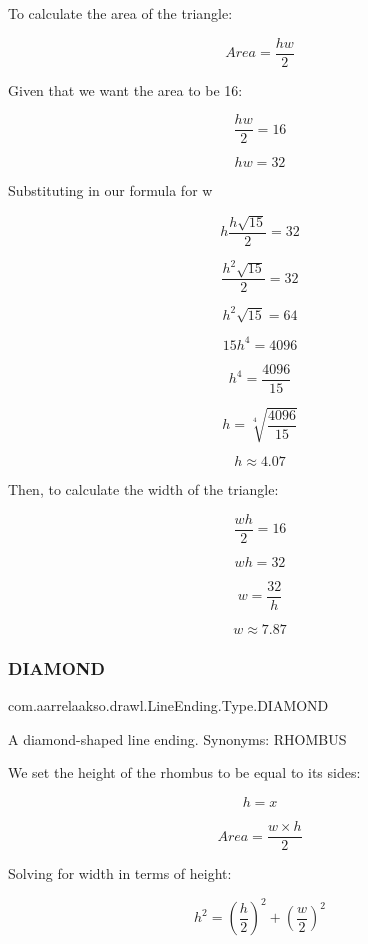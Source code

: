 To calculate the area of the triangle\+:

\[Area = \frac{hw}{2}\]

Given that we want the area to be 16\+:

\[ \frac{hw}{2} = 16\]

\[hw = 32\]

Substituting in our formula for w

\[h \frac{h \sqrt{15}}{2} = 32\]

\[\frac{h^2 \sqrt{15}}{2} = 32\]

\[h^2 \sqrt{15} = 64\]

\[15 h^4 = 4096\]

\[h^4 = \frac{4096}{15}\]

\[h = \sqrt[4]{\frac{4096}{15}}\]

\[h \approx 4.07\]

Then, to calculate the width of the triangle\+:

\[\frac{wh}{2} = 16\]

\[wh = 32\]

\[w = \frac{32}{h}\]

\[w \approx 7.87\] \mbox{\label{enumcom_1_1aarrelaakso_1_1drawl_1_1_line_ending_1_1_type_aa3ce0f93b6befa8383c516df010aeed4}} 
\subsubsection{\texorpdfstring{D\+I\+A\+M\+O\+ND}{DIAMOND}}
{\footnotesize\ttfamily com.\+aarrelaakso.\+drawl.\+Line\+Ending.\+Type.\+D\+I\+A\+M\+O\+ND}

A diamond-\/shaped line ending. Synonyms\+: R\+H\+O\+M\+B\+US



We set the height of the rhombus to be equal to its sides\+:

\[h = x\]

\[Area = \frac{w \times h}{2}\]

Solving for width in terms of height\+:

\[h^2 = (\frac{h}{2})^2 + (\frac{w}{2})^2\]

